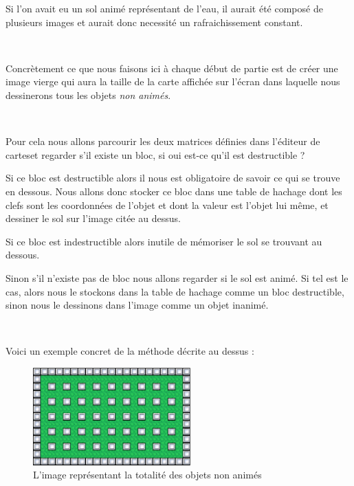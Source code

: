 			
			Si l'on avait eu un sol animé représentant de l'eau, il aurait été composé de
			plusieurs images et aurait donc necessité un rafraichissement constant.

			$\,$
			
			Concrètement ce que nous faisons ici à chaque début de partie est de créer
			une image vierge qui aura la taille de la carte affichée sur l'écran dans
			laquelle nous dessinerons tous les objets \emph{non animés}.
			
			$\,$
			
			Pour cela nous allons parcourir les deux matrices définies dans l'éditeur de
			cartes\footnotemark[2] et regarder s'il existe un bloc, si oui est-ce
			qu'il est destructible ?
			
			Si ce bloc est destructible alors il nous est obligatoire de savoir ce qui se
			trouve en dessous.
			Nous allons donc stocker ce bloc dans une table de hachage dont les clefs sont les
			coordonnées de l'objet et dont la valeur est l'objet lui même, et dessiner le
			sol sur l'image citée au dessus.
			
			Si ce bloc est indestructible alors inutile de mémoriser le sol se trouvant
			au dessous.
			
			Sinon s'il n'existe pas de bloc nous allons regarder si le sol est animé. Si
			tel est le cas, alors nous le stockons dans la table de hachage comme un bloc
			destructible, sinon nous le dessinons dans l'image comme un objet inanimé.
			
			$\,$
			
			Voici un exemple concret de la méthode décrite au dessus :
				

			\begin{figure}[!h]			
				\begin{center}			
					\includegraphics[width=229px, height=142px]{Developpement/Img/map.eps}
					\caption{L'image représentant la totalité des objets non animés}
				\end{center}
			\end{figure}
			
			$\,$			

